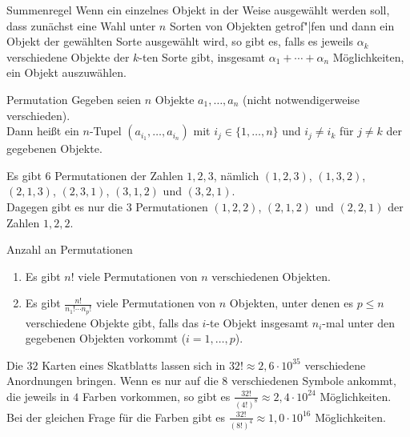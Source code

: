 \begin{Satz}{Summenregel}
    Wenn ein einzelnes Objekt in der Weise ausgewählt werden soll, dass zunächst eine Wahl unter
    $n$ Sorten von Objekten getrof"|fen und dann ein Objekt der gewählten Sorte ausgewählt wird,
    so gibt es, falls es jeweils $\alpha_k$ verschiedene Objekte der $k$-ten Sorte gibt,
    insgesamt $\alpha_1 + \dotsb + \alpha_n$ Möglichkeiten, ein Objekt auszuwählen.
\end{Satz}

\linie

\begin{Def}{Permutation}
    Gegeben seien $n$ Objekte $a_1, \dotsc, a_n$ (nicht notwendigerweise verschieden).\\
    Dann heißt ein $n$-Tupel $(a_{i_1}, \dotsc, a_{i_n})$ mit $i_j \in \{1, \dotsc, n\}$ und
    $i_j \not= i_k$ für $j \not= k$  der gegebenen Objekte.
\end{Def}

\begin{Bsp}
    Es gibt $6$ Permutationen der Zahlen $1, 2, 3$, nämlich
    $(1, 2, 3)$, $(1, 3, 2)$, $(2, 1, 3)$, $(2, 3, 1)$, $(3, 1, 2)$ und $(3, 2, 1)$.\\
    Dagegen gibt es nur die $3$ Permutationen $(1, 2, 2)$, $(2, 1, 2)$ und $(2, 2, 1)$
    der Zahlen $1, 2, 2$.
\end{Bsp}

\begin{Satz}{Anzahl an Permutationen}
    \begin{enumerate}
        \item
        Es gibt $n!$ viele Permutationen von $n$ verschiedenen Objekten.
        
        \item
        Es gibt $\frac{n!}{n_1! \dotsm n_p!}$ viele Permutationen von $n$ Objekten,
        unter denen es $p \le n$ verschiedene Objekte gibt,
        falls das $i$-te Objekt insgesamt $n_i$-mal unter den gegebenen Objekten vorkommt
        ($i = 1, \dotsc, p$).
    \end{enumerate}
\end{Satz}

\begin{Bsp}
    Die $32$ Karten eines Skatblatts lassen sich in $32! \approx 2{,}6 \cdot 10^{35}$
    verschiedene Anordnungen bringen.
    Wenn es nur auf die $8$ verschiedenen Symbole ankommt, die jeweils in $4$ Farben vorkommen,
    so gibt es $\frac{32!}{(4!)^8} \approx 2{,}4 \cdot 10^{24}$ Möglichkeiten.
    Bei der gleichen Frage für die Farben gibt es $\frac{32!}{(8!)^4} \approx 1{,}0 \cdot 10^{16}$
    Möglichkeiten.
\end{Bsp}

